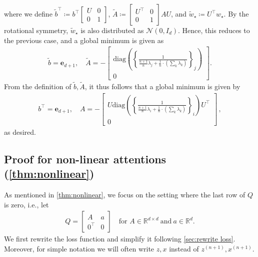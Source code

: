 \documentclass{article}
\newcommand{\R}{\mathbb{R}}
\newcommand{\bb}{A}
\newcommand{\cc}{b}
\newcommand{\ttbb}{\widetilde{\bb}}
\newcommand{\ttcc}{\widetilde{\cc}}
\newcommand{\wstar}{w_\star}
\newcommand{\twstar}{\widetilde{w}_\star}
\newcommand{\tz}[1]{{z^{(#1)}}}
\newcommand{\tx}[1]{x^{(#1)}}
\newcommand{\e}{\mathbf{e}}
\begin{document}
where we define $\ttcc^\top  \coloneqq \cc^\top \begin{bmatrix}U & 0 \\0 & 1\end{bmatrix}$, $\ttbb\coloneqq \begin{bmatrix}U^\top & 0 \\0 & 1\end{bmatrix}\bb U$, and $\twstar \coloneqq U^\top \wstar$.
By the rotational symmetry, $\twstar$ is also distributed as $\mathcal{N}(0, I_d)$.
Hence, this reduces to the previous case, and a global minimum is given as  
\begin{align}
\ttcc = \e_{d+1},\quad \ttbb =  - \begin{bmatrix}
\mathrm{diag}\left(\left\{\frac{1}{  \frac{n+1}{n}  \lambda_j +   \frac{1}{n} \cdot \left( \sum_k \lambda_k  \right)   } \right\}_j\right)   \\
0  
\end{bmatrix} .
\end{align}
From the definition of $\ttcc,\ttbb$, it thus follows that a global minimum is given by
\begin{align}      \cc^\top = \e_{d+1} ,\quad \bb =  - \begin{bmatrix}
U \mathrm{diag}\left(\left\{\frac{1}{  \frac{n+1}{n}  \lambda_i +   \frac{1}{n} \cdot \left( \sum_k \lambda_k  \right)   } \right\}_i\right) U^\top \\
0  
\end{bmatrix}\,,
\end{align}
as desired.

 

\subsection{Proof for non-linear attentions (\autoref{thm:nonlinear})}
\label{pf:nonlinear}

As mentioned in  \autoref{thm:nonlinear}, we focus on the setting where the last row of $Q$ is zero, i.e., let
\begin{align}
Q = \begin{bmatrix} A & a  \\
0^\top & 0 \end{bmatrix}\quad \text{for }A\in \R^{d\times d}~\text{and}~a \in \R^d.
\end{align}
We first rewrite the loss function and simplify it 
following \autoref{sec:rewrite loss}.
Moreover, for simple notation we will often write $z,x$ instead of  $\tz{n+1},\tx{n+1}$.
\end{document}
